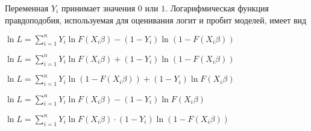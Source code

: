 
\begin{question}
Переменная \(Y_i\) принимает значения \(0\) или \(1\).
Логарифмическая функция правдоподобия, используемая для оценивания логит и пробит моделей, имеет вид
\begin{answerlist}
  \item \(\ln L = \sum_{i=1}^n Y_i \ln F(X_i \beta) - (1 - Y_i) \ln (1 - F(X_i \beta))\)
  \item \(\ln L = \sum_{i=1}^n Y_i \ln F(X_i \beta) + (1 - Y_i) \ln (1 - F(X_i \beta))\)
  \item \(\ln L = \sum_{i=1}^n Y_i \ln (1 - F(X_i \beta)) + (1 - Y_i) \ln F(X_i \beta)\)
  \item \(\ln L = \sum_{i=1}^n Y_i \ln F(X_i \beta) - (1 - Y_i) \ln F(X_i \beta)\)
  \item \(\ln L = \sum_{i=1}^n Y_i \ln F(X_i \beta) \cdot (1 - Y_i) \ln (1 - F(X_i \beta))\)
\end{answerlist}
\end{question}


